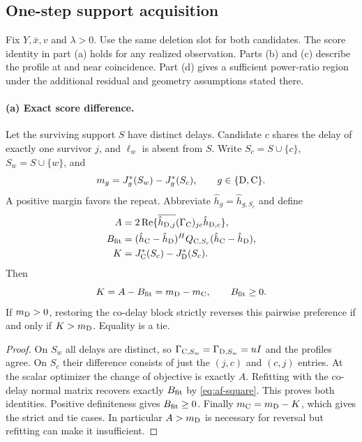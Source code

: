 \subsection{One-step support acquisition}

\begin{afdmprop}
\label{prop:af-split}
Fix $Y,\bar x,v$ and $\lambda>0$. Use the same deletion slot for both
candidates. The score identity in part (a) holds for any realized
observation. Parts (b) and (c) describe the profile at and near
coincidence. Part (d) gives a sufficient power-ratio region under the
additional residual and geometry assumptions stated there.
\end{afdmprop}

\paragraph{(a) Exact score difference.}
Let the surviving support $S$ have distinct delays. Candidate $c$ shares
the delay of exactly one survivor $j$, and $\ell_w$ is absent from $S$.
Write $S_c=S\cup\{c\}$, $S_w=S\cup\{w\}$, and
\[
 m_g=J_g^*(S_w)-J_g^*(S_c),\qquad g\in\{{\rm D},{\rm C}\}.
\]
A positive margin favors the repeat. Abbreviate
$\hat h_g=\hat h_{g,S_c}$ and define
\begin{align}
 A&=2\operatorname{Re}
       \{\overline{\hat h_{{\rm D},j}}
              (\Gamma_{\rm C})_{jc}\hat h_{{\rm D},c}\},\\
 B_{\rm fit}&=(\hat h_{\rm C}-\hat h_{\rm D})^H
                  Q_{{\rm C},S_c}(\hat h_{\rm C}-\hat h_{\rm D}),\\
 K&=J_{\rm C}^*(S_c)-J_{\rm D}^*(S_c).
\end{align}
Then
\begin{equation}
 K=A-B_{\rm fit}=m_{\rm D}-m_{\rm C},\qquad B_{\rm fit}\ge0 .
 \label{eq:af-score}
\end{equation}
If $m_{\rm D}>0$, restoring the co-delay block strictly reverses this
pairwise preference if and only if $K>m_{\rm D}$. Equality is a tie.

\begin{proof}
On $S_w$ all delays are distinct, so
$\Gamma_{{\rm C},S_w}=\Gamma_{{\rm D},S_w}=uI$ and the profiles agree.
On $S_c$ their difference consists of just the $(j,c)$ and $(c,j)$
entries. At the scalar optimizer the change of objective is exactly $A$.
Refitting with the co-delay normal matrix recovers exactly $B_{\rm fit}$
by \eqref{eq:af-square}. This proves both identities. Positive
definiteness gives $B_{\rm fit}\ge0$. Finally $m_{\rm C}=m_{\rm D}-K$,
which gives the strict and tie cases. In particular $A>m_{\rm D}$ is
necessary for reversal but refitting can make it insufficient.
\end{proof}

